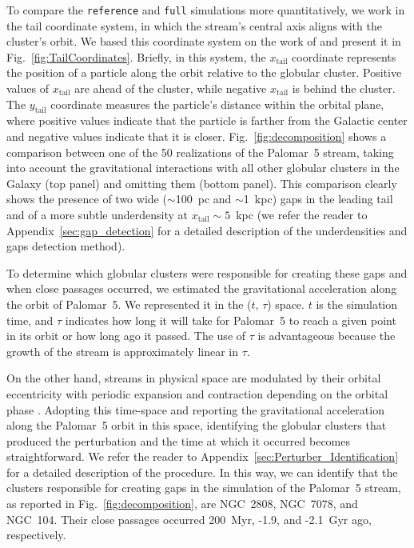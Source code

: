         To compare the \texttt{reference} and \texttt{full} simulations more quantitatively, we work in the tail coordinate system, in which the stream's central axis aligns with the cluster's orbit. We based this coordinate system on the work of \citet{2004AJ....127.2753D} and present it in Fig.~\ref{fig:TailCoordinates}. Briefly, in this system, the $x_{\textrm{tail}}$ coordinate represents the position of a particle along the orbit relative to the globular cluster. Positive values of $x_{\textrm{tail}}$ are ahead of the cluster, while negative $x_{\textrm{tail}}$ is behind the cluster. The $y_{\textrm{tail}}$ coordinate measures the particle's distance within the orbital plane, where positive values indicate that the particle is farther from the Galactic center and negative values indicate that it is closer. Fig.~\ref{fig:decomposition} shows a comparison between one of the 50 realizations of the Palomar~5 stream, taking into account the gravitational interactions with all other globular clusters in the Galaxy (top panel) and omitting them (bottom panel). This comparison clearly shows the presence of two wide ($\sim$100~pc and $\sim$1~kpc) gaps in the leading tail and of a more subtle underdensity at $x_{\textrm{tail}}\sim 5$~kpc (we refer the reader to Appendix~\ref{sec:gap_detection} for a detailed description of the underdensities and gaps detection method). 
    
        To determine which globular clusters were responsible for creating these gaps and when close passages occurred, we estimated the gravitational acceleration along the orbit of Palomar~5. We represented it in the ($t$, $\tau$) space. $t$ is the simulation time, and $\tau$ indicates how long it will take for Palomar~5 to reach a given point in its orbit or how long ago it passed. The use of $\tau$ is advantageous because the growth of the stream is approximately linear in $\tau$. 
    
        On the other hand, streams in physical space are modulated by their orbital eccentricity with periodic expansion and contraction depending on the orbital phase \citep[see the top panel of Fig.~5.][for an example]{2016MNRAS.457.3817S}. Adopting this time-space and reporting the gravitational acceleration along the Palomar~5 orbit in this space, identifying the globular clusters that produced the perturbation and the time at which it occurred becomes straightforward. We refer the reader to Appendix~\ref{sec:Perturber_Identification} for a detailed description of the procedure. In this way, we can identify that the clusters responsible for creating gaps in the simulation of the Palomar~5 stream, as reported in Fig.~\ref{fig:decomposition}, are NGC~2808, NGC~7078, and NGC~104. Their close passages occurred 200~Myr, -1.9, and -2.1~Gyr ago, respectively. 
    
